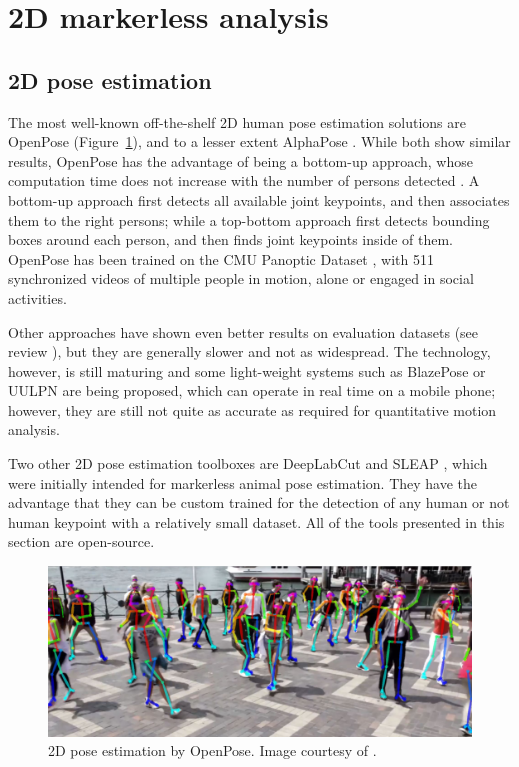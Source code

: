 \FloatBarrier
\section{2D markerless analysis}
\subsection{2D pose estimation}

The most well-known off-the-shelf 2D human pose estimation solutions are OpenPose \cite{Cao2019} (Figure~\ref{fig_openpose}), and to a lesser extent AlphaPose \cite{Fang2017}. While both show similar results, OpenPose has the advantage of being a bottom-up approach, whose computation time does not increase with the number of persons detected \cite{Cao2019}. A bottom-up approach first detects all available joint keypoints, and then associates them to the right persons; while a top-bottom approach first detects bounding boxes around each person, and then finds joint keypoints inside of them. OpenPose has been trained on the CMU Panoptic Dataset \cite{Joo2015}, with 511 synchronized videos of multiple people in motion, alone or engaged in social activities. 

Other approaches have shown even better results on evaluation datasets (see review \cite{Chen2020}), but they are generally slower and not as widespread. The technology, however, is still maturing and some light-weight systems such as BlazePose \cite{Bazarevsky2020} or UULPN \cite{Wang2022c} are being proposed, which can operate in real time on a mobile phone; however, they are still not quite as accurate as required for quantitative motion analysis.

Two other 2D pose estimation toolboxes are DeepLabCut \cite{Mathis2018} and SLEAP \cite{Pereira2022}, which were initially intended for markerless animal pose estimation. They have the advantage that they can be custom trained for the detection of any human or not human keypoint with a relatively small dataset. All of the tools presented in this section are open-source. 

\begin{figure}[hbtp]
	\centering
	\def\svgwidth{1\columnwidth}
	\fontsize{10pt}{10pt}\selectfont
	\includegraphics[width=\linewidth]{"../Chap1/Figures/OpenPose.JPG"}
	\caption{2D pose estimation by OpenPose. Image courtesy of \cite{Cao2019}.}
	\label{fig_openpose}
\end{figure}

